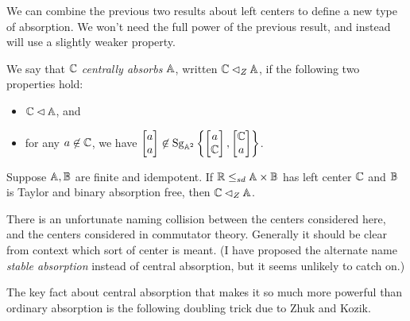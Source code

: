 \documentclass[letterpaper,11pt]{article}
\DeclareMathOperator{\Sg}{Sg}
\begin{document}
We can combine the previous two results about left centers to define a new type of absorption. We won't need the full power of the previous result, and instead will use a slightly weaker property.

\begin{defn} We say that $\mathbb{C}$ \emph{centrally absorbs} $\mathbb{A}$, written $\mathbb{C} \lhd_Z \mathbb{A}$, if the following two properties hold:
\begin{itemize}
\item $\mathbb{C} \lhd \mathbb{A}$, and
\item for any $a \not\in \mathbb{C}$, we have $\begin{bmatrix}a\\ a\end{bmatrix} \not\in \Sg_{\bA^2}\left\{\begin{bmatrix}a\\ \bC\end{bmatrix}, \begin{bmatrix}\bC\\ a\end{bmatrix}\right\}$.
\end{itemize}
\end{defn}

\begin{cor}\label{zhuk-center} Suppose $\mathbb{A}, \mathbb{B}$ are finite and idempotent. If $\mathbb{R} \le_{sd} \mathbb{A} \times \mathbb{B}$ has left center $\mathbb{C}$ and $\mathbb{B}$ is Taylor and binary absorption free, then $\mathbb{C} \lhd_Z \mathbb{A}$.
\end{cor}

There is an unfortunate naming collision between the centers considered here, and the centers considered in commutator theory. Generally it should be clear from context which sort of center is meant. (I have proposed the alternate name \emph{stable absorption} instead of central absorption, but it seems unlikely to catch on.)

The key fact about central absorption that makes it so much more powerful than ordinary absorption is the following doubling trick due to Zhuk and Kozik.
\end{document}

